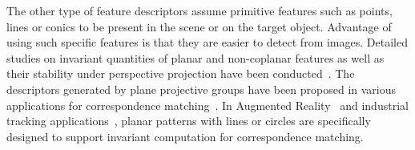 \documentclass{bmvc2k}
\def\etal{\emph{et al}\bmvaOneDot}
\begin{document}
\par 
The other type of feature descriptors assume primitive features such as points, lines or conics to be present in the scene or on the target object. 
Advantage of using such specific features is that they are easier to detect from images.
Detailed studies on invariant quantities of planar and non-coplanar features as well as their stability under perspective projection have been conducted~\cite{forsyth_91,gros_projective_1992}.
The descriptors generated by plane projective groups have been proposed in various applications for correspondence matching~\cite{Matsunaga2000,uchiyama_random_2011,ying_camera_2007}.
In Augmented Reality~\cite{uchiyama_random_2011,van_rhijn_optical_2004} and industrial tracking applications~\cite{AICON}, planar patterns with lines or circles are specifically designed to support invariant computation for correspondence matching.  
\end{document}
